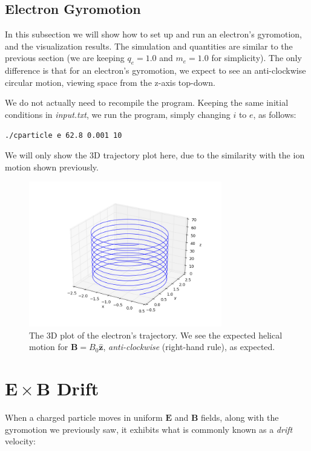 \documentclass[11pt]{report}
\begin{document}
\newpage

\subsection{Electron Gyromotion}
In this subsection we will show how to set up and run an electron's gyromotion, and the visualization results. The simulation and quantities are similar to the previous section (we are keeping $q_e = 1.0$ and $m_e = 1.0$ for simplicity). The only difference is that for an electron's gyromotion, we expect to see an anti-clockwise circular motion, viewing space from the z-axis top-down. 
\newline

We do not actually need to recompile the program. Keeping the same initial conditions in \emph{input.txt}, we run the program, simply changing $i$ to $e$, as follows:

\begin{lstlisting}
./cparticle e 62.8 0.001 10
\end{lstlisting}

We will only show the 3D trajectory plot here, due to the similarity with the ion motion shown previously.

\begin{figure}[!ht]
  \centering
    \includegraphics[width=0.75\textwidth]{images/gyro_electron_3d}
     \caption{The 3D plot of the electron's trajectory. We see the expected helical motion for $\bm{B} = B_0\hat{\bm{z}}$, \emph{anti-clockwise} (right-hand rule), as expected.}
\end{figure}

\newpage
\section{$\bm{E} \times \bm{B}$ Drift}
When a charged particle moves in uniform $\bm{E}$ and $\bm{B}$ fields, along with the gyromotion we previously saw, it exhibits what is commonly known as a \emph{drift} velocity:
\end{document}
